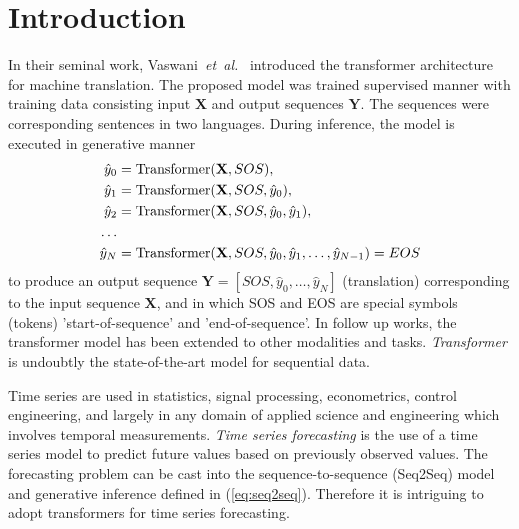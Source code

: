 \documentclass[final]{article}
\begin{document}
\section{Introduction}
In their seminal work, Vaswani~\textit{et~al.}~\cite{transformer} introduced
the transformer architecture for machine translation. The proposed model
was trained supervised manner with training data consisting input $\mathbf{X}$ and output sequences $\mathbf{Y}$. The sequences were corresponding sentences in two languages. During inference, the model is executed
in generative manner
\begin{displaymath}
  \begin{split}
    \hat{y}_0 &= \hbox{Transformer}(\mathbf{X},SOS),\\
    \hat{y}_1 &= \hbox{Transformer}(\mathbf{X},SOS,\hat{y}_0),\\ 
    \hat{y}_2 &= \hbox{Transformer}(\mathbf{X},SOS,\hat{y}_0,\hat{y}_1),\\
    \ldots \\
    \hat{y}_N &= \hbox{Transformer}(\mathbf{X},SOS,\hat{y}_0,\hat{y}_1,\ldots,\hat{y}_{N-1}) = EOS    
  \end{split}
  \label{eq:seq2seq}
\end{displaymath}
to produce an output sequence $\mathbf{Y} = \left[ SOS, \hat{y}_0, \ldots, \hat{y}_N \right]$
(translation) corresponding to the input sequence $\mathbf{X}$, and in which SOS and EOS are
special symbols (tokens) 'start-of-sequence' and 'end-of-sequence'. In follow up works, the transformer model has been extended to other modalities and tasks.
\textit{Transformer} is undoubtly the state-of-the-art model for
sequential data.

Time series are used in statistics, signal processing, econometrics, control engineering, and largely in any domain of applied science and engineering which involves temporal measurements.
\textit{Time series forecasting} is the use of a time series model to predict future values based on previously observed values. The forecasting problem can be cast into the sequence-to-sequence (Seq2Seq) model and generative inference defined in (\ref{eq:seq2seq}). Therefore it is intriguing to adopt transformers for time series forecasting.
\end{document}
